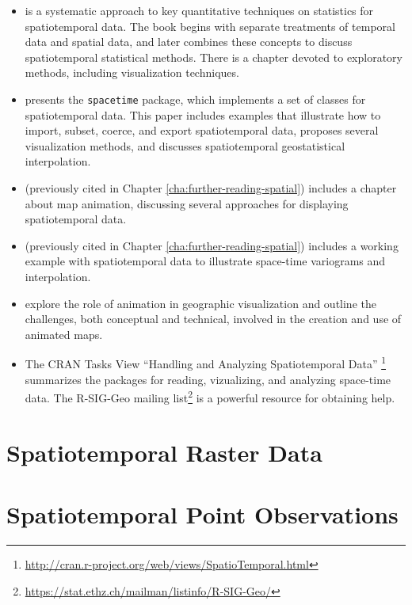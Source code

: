 \begin{itemize}

\item \cite{Cressie.Wikle2011} is a systematic approach to key
  quantitative techniques on statistics for spatiotemporal data.
  The book begins with separate treatments of temporal data and
  spatial data, and later combines these concepts to discuss
  spatiotemporal statistical methods. There is a chapter devoted
  to exploratory methods, including visualization techniques.

\item \cite{Pebesma2012} presents the \texttt{spacetime} package, which
  implements a set of classes for spatiotemporal data. This paper
  includes examples that illustrate how to import, subset, coerce, and
  export spatiotemporal data, proposes several visualization methods,
  and discusses spatiotemporal geostatistical interpolation.

\item \cite{Slocum.McMaster.ea2005} (previously cited in Chapter
  \ref{cha:further-reading-spatial}) includes a chapter about map
  animation, discussing several approaches for displaying
  spatiotemporal data.

\item \cite{Hengl2009} (previously cited in Chapter
  \ref{cha:further-reading-spatial}) includes a working example
  with spatiotemporal data to illustrate space-time variograms
  and interpolation.

\item \cite{Harrower.Fabrikant2008} explore the role of animation in
  geographic visualization and outline the challenges, both conceptual
  and technical, involved in the creation and use of animated maps.

\item The CRAN Tasks View ``Handling and Analyzing Spatiotemporal
  Data''
  \footnote{\url{http://cran.r-project.org/web/views/SpatioTemporal.html}}
  summarizes the packages for reading, vizualizing, and analyzing
  space-time data.  The R-SIG-Geo mailing
  list\footnote{\url{https://stat.ethz.ch/mailman/listinfo/R-SIG-Geo/}}
  is a powerful resource for obtaining help.

\end{itemize}



\chapter{Spatiotemporal Raster Data}
\label{cha:rasterST}



\chapter{Spatiotemporal Point Observations}
\label{cha:pointsST}




